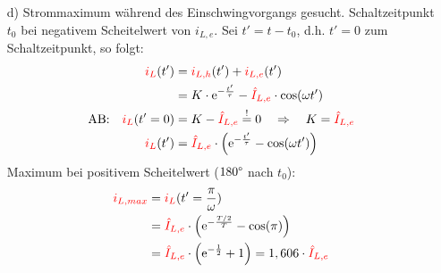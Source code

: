 {\begin{itemize}
    D.h. für verschwindenden flüchtigen Zustand (kein Einschwingvorgang) folgt:
    \begin{align*}
        &\text{AB:}&\eci{i_L}(t_0) = \eci{i_{L,e}}(t_0) &= \eci{\hat{I}_{L,e}} \cdot \sin(\omega t_0 + \varphi) \overset{!}= 0 &
            &\Rightarrow \eci{i_L}(t')=\eci{i_{L,e}}(t') \Leftrightarrow \eci{i_{L,f}}(t')=0\\
        &&\Leftrightarrow \omega t_0 + \varphi &\overset{!}{=} 0 + n\cdot \pi &
            &\text{mit} \quad n \in \mathbb{N} \\
        &&t_{min} &= \frac{n\cdot \pi - \varphi}{\omega} &
            &\text{entspricht Nulldurchgängen von $\eci{i_{L,e}}$}\\
        \end{align*}
        Und für maximalen flüchtigen Zustand (Schaltzeitpunkt $90\degree$ versetzt) folgt:
        \begin{align*}
        &&t_{max} &= \frac{n\cdot \pi - \varphi}{\omega} + \frac{T}{4} &
            &\text{entspricht Extremstellen von $\eci{i_{L,e}}$}
    \end{align*}
    \item[d)] Strommaximum während des Einschwingvorgangs gesucht. 
    Schaltzeitpunkt $t_0$ bei negativem Scheitelwert von $i_{L,e}$. 
    Sei $t' = t - t_0$, d.h. $t'=0$ zum Schaltzeitpunkt, so folgt:
    \begin{align*}
        {\color{red}i_L}(t') &= {\color{red}i_{L,h}}(t') + {\color{red}i_{L,e}}(t') \\
        &= K \cdot \mathrm{e}^{-\frac{t'}{\tau}} - {\color{red}\hat{I}_{L,e}} \cdot \cos(\omega t')\\
        \text{AB:}\quad {\color{red}i_L}(t'=0) &= K - {\color{red}\hat{I}_{L,e}}  \overset{!}{=}0 \quad \Rightarrow \quad K = {\color{red}\hat{I}_{L,e}}\\
        {\color{red}i_L}(t') &= {\color{red}\hat{I}_{L,e}} \cdot \left( \mathrm{e}^{-\frac{t'}{\tau}} - \cos(\omega t') \right) \\
        \end{align*}
        Maximum bei positivem Scheitelwert ($180\degree$ nach $t_0$):
        \begin{align*}
        {\color{red}i_{L,max}} &= {\color{red}i_L}(t' = \frac{\pi}{\omega}) \\
        &= {\color{red}\hat{I}_{L,e}} \cdot \left( \mathrm{e}^{-\frac{T/2}{T}} - \cos(\pi) \right) \\
        &= {\color{red}\hat{I}_{L,e}} \cdot \left( \mathrm{e}^{-\frac{1}{2}} + 1\right) = 1,606 \cdot {\color{red}\hat{I}_{L,e}}
    \end{align*}
    \end{itemize}
}